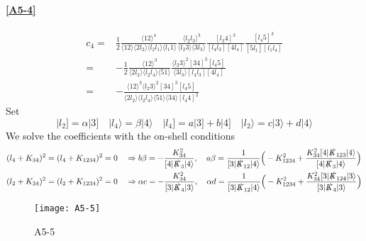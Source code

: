 \paragraph{\ref{A5-4}}
\begin{equation*}
\begin{split}
c_4 = & \frac{1}{2}\frac{\langle 12 \rangle^4}{\langle 12 \rangle\langle 2l_2 \rangle\langle l_2 l_1 \rangle\langle l_1 1 \rangle}
\frac{\langle l_2 l_3 \rangle^3}{\langle l_2 3 \rangle \langle 3 l_3 \rangle}
\frac{[l_3 4 ]^3}{[l_4 l_3][4 l_4]}
\frac{[l_4 5]^3}{[5l_1][l_1 l_4]}
\\
= &
-\frac{1}{2}\frac{\langle 12 \rangle^3}{\langle 2l_2\rangle\langle l_2 l_4 \rangle\langle 51 \rangle}
\frac{\langle l_2 3 \rangle^2 [34]^3 [l_4 5]}{\langle 3 l_3 \rangle [l_4 l_3][4 l_4]}
\\
= &
-\frac{\langle 12 \rangle^3\langle l_2 3\rangle^2[34]^3[l_4 5]}{\langle 2 l_2 \rangle\langle l_2 l_4 \rangle\langle 51 \rangle\langle 34 \rangle [l_4 4]^2}
\end{split}
\end{equation*}
Set
\begin{equation*}
|l_2] = \alpha|3] \quad
|l_4\rangle = \beta|4\rangle \quad
|l_4] = a|3] + b|4] \quad
|l_2\rangle = c|3\rangle + d|4\rangle
\end{equation*}
We solve the coefficients with the on-shell conditions
\begin{equation*}
\begin{split}
& (l_4 + K_{34})^2 = (l_4 +K_{1234})^2 = 0 \quad\Rightarrow
b\beta = -\frac{K_{34}^2}{[4|\slashed{K}_3|4\rangle} ,\quad
a\beta = \frac{1}{[3|\slashed{K}_{12}|4\rangle}\Big( -K_{1234}^2 + \frac{K_{34}^2 [4|\slashed{K}_{123}|4\rangle}{[4|\slashed{K}_3|4\rangle}\Big)
\\
&
(l_2 + K_{34})^2 = (l_2 + K_{1234})^2 = 0 \quad\Rightarrow
\alpha c = -\frac{K_{34}^2}{[3|\slashed{K}_4|3\rangle} ,\quad
\alpha d = \frac{1}{[3|\slashed{K}_{12}|4\rangle}\Big(-K_{1234}^2 + \frac{K_{34}^2 [3|\slashed{K}_{124}|3\rangle}{[3|\slashed{K}_4|3\rangle}\Big)
\end{split}
\end{equation*}
%
%
\begin{figure}
  \centering
    \texttt{[image: A5-5]}
    \caption{A5-5}
  \label{A5-5}
\end{figure}
